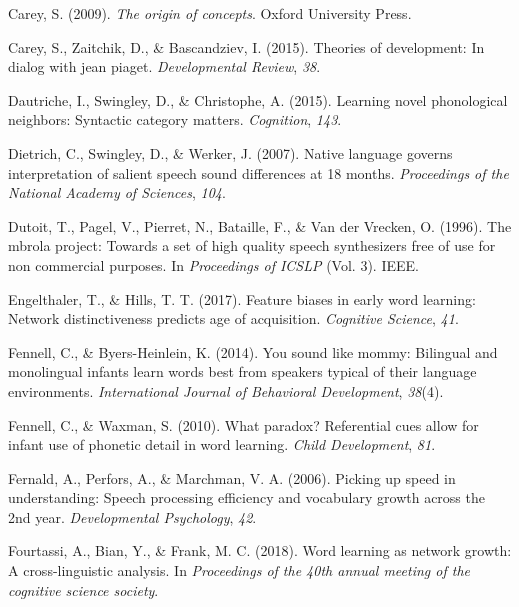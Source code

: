 \documentclass[english,,man]{apa6}
\begin{document}
\leavevmode\hypertarget{ref-carey2009}{}%
Carey, S. (2009). \emph{The origin of concepts}. Oxford University Press.

\leavevmode\hypertarget{ref-carey2015}{}%
Carey, S., Zaitchik, D., \& Bascandziev, I. (2015). Theories of development: In dialog with jean piaget. \emph{Developmental Review}, \emph{38}.

\leavevmode\hypertarget{ref-dautriche2015}{}%
Dautriche, I., Swingley, D., \& Christophe, A. (2015). Learning novel phonological neighbors: Syntactic category matters. \emph{Cognition}, \emph{143}.

\leavevmode\hypertarget{ref-dietrich2007}{}%
Dietrich, C., Swingley, D., \& Werker, J. (2007). Native language governs interpretation of salient speech sound differences at 18 months. \emph{Proceedings of the National Academy of Sciences}, \emph{104}.

\leavevmode\hypertarget{ref-dutoit1996}{}%
Dutoit, T., Pagel, V., Pierret, N., Bataille, F., \& Van der Vrecken, O. (1996). The mbrola project: Towards a set of high quality speech synthesizers free of use for non commercial purposes. In \emph{Proceedings of ICSLP} (Vol. 3). IEEE.

\leavevmode\hypertarget{ref-engelthaler2017}{}%
Engelthaler, T., \& Hills, T. T. (2017). Feature biases in early word learning: Network distinctiveness predicts age of acquisition. \emph{Cognitive Science}, \emph{41}.

\leavevmode\hypertarget{ref-Fennell2014}{}%
Fennell, C., \& Byers-Heinlein, K. (2014). You sound like mommy: Bilingual and monolingual infants learn words best from speakers typical of their language environments. \emph{International Journal of Behavioral Development}, \emph{38}(4).

\leavevmode\hypertarget{ref-fennell2010}{}%
Fennell, C., \& Waxman, S. (2010). What paradox? Referential cues allow for infant use of phonetic detail in word learning. \emph{Child Development}, \emph{81}.

\leavevmode\hypertarget{ref-fernald2006}{}%
Fernald, A., Perfors, A., \& Marchman, V. A. (2006). Picking up speed in understanding: Speech processing efficiency and vocabulary growth across the 2nd year. \emph{Developmental Psychology}, \emph{42}.

\leavevmode\hypertarget{ref-fourtassi2018}{}%
Fourtassi, A., Bian, Y., \& Frank, M. C. (2018). Word learning as network growth: A cross-linguistic analysis. In \emph{Proceedings of the 40th annual meeting of the cognitive science society}.
\end{document}
